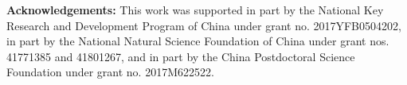 \documentclass[10pt,twocolumn,letterpaper]{article}
\begin{document}
\noindent \textbf{Acknowledgements:}
This work was supported in part by the National Key Research and Development Program of China under grant no. 2017YFB0504202, in part by the National Natural Science Foundation of China under grant nos. 41771385 and 41801267, and in part by the China Postdoctoral Science Foundation under grant no. 2017M622522.

{\small


}
\end{document}
